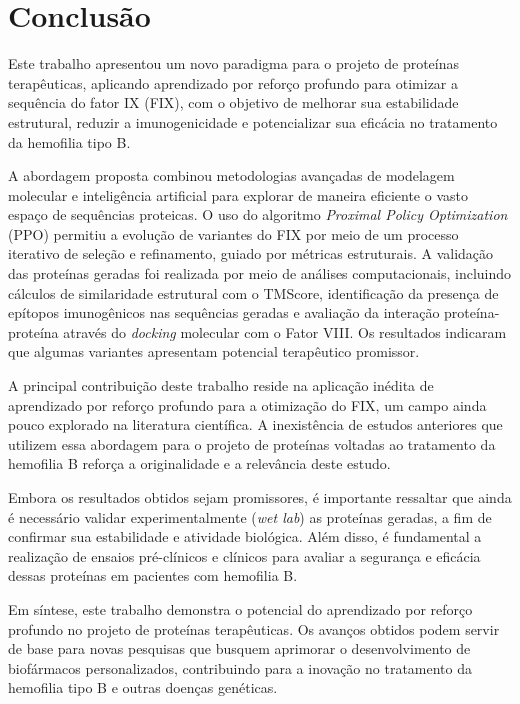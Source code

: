 \chapter{Conclusão}

Este trabalho apresentou um novo paradigma para o projeto de proteínas terapêuticas,
aplicando aprendizado por reforço profundo para otimizar a sequência do fator IX (FIX),
com o objetivo de melhorar sua estabilidade estrutural, 
reduzir a imunogenicidade e potencializar sua eficácia no tratamento da hemofilia tipo B.  

A abordagem proposta combinou metodologias avançadas de modelagem molecular e inteligência artificial 
para explorar de maneira eficiente o vasto espaço de sequências proteicas. 
O uso do algoritmo \textit{Proximal Policy Optimization} (PPO) permitiu a evolução de variantes do FIX 
por meio de um processo iterativo de seleção e refinamento, 
guiado por métricas estruturais. 
A validação das proteínas geradas foi realizada por meio de análises computacionais, 
incluindo cálculos de similaridade estrutural com o TMScore, identificação da presença de epítopos imunogênicos nas sequências geradas
e avaliação da interação proteína-proteína através do \textit{docking} molecular com o Fator VIII.
Os resultados indicaram que algumas variantes apresentam potencial terapêutico promissor.  

A principal contribuição deste trabalho reside na aplicação inédita de aprendizado por reforço profundo
para a otimização do FIX, um campo ainda pouco explorado na literatura científica. 
A inexistência de estudos anteriores que utilizem essa abordagem para o projeto de proteínas 
voltadas ao tratamento da hemofilia B reforça a originalidade e a relevância deste estudo.  

Embora os resultados obtidos sejam promissores, 
é importante ressaltar que ainda é necessário validar experimentalmente (\textit{wet lab})
as proteínas geradas, a fim de confirmar sua estabilidade e atividade biológica.
Além disso, é fundamental a realização de ensaios pré-clínicos e clínicos
para avaliar a segurança e eficácia dessas proteínas em pacientes com hemofilia B.

Em síntese, este trabalho demonstra o potencial do aprendizado por reforço profundo no projeto 
de proteínas terapêuticas. 
Os avanços obtidos podem servir de base para novas pesquisas que busquem aprimorar o 
desenvolvimento de biofármacos personalizados, 
contribuindo para a inovação no tratamento da hemofilia tipo B e outras doenças genéticas.

